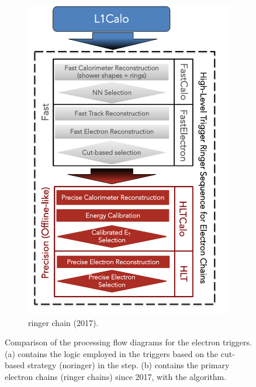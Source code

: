 \begin{figure}[h!tb]
\begin{center}
\begin{subfigure}[c]{.48\textwidth}
  \includegraphics[width=\textwidth]{sections/context/figures/ElectronChain_Run2_ringer.pdf}
  \caption{ringer chain (2017).}
  \end{subfigure}
  \caption{Comparison of the processing flow diagrams for the electron triggers. (a)
  contains the logic employed in the triggers based on the cut-based strategy
  (noringer) in the \fastcalo step. (b) contains the primary electron
  chains (ringer chains) since 2017, with the \rnn{} algorithm.}%
  \label{fig:ringer_chains}
  \end{center}
\end{figure}

  

